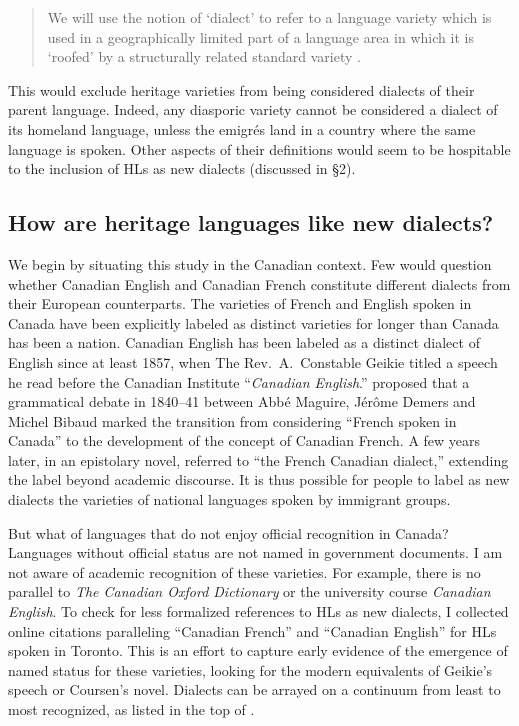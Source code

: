 \documentclass[output=paper]{LSP/langsci}
\begin{document}
\begin{quote}
We will use the notion of ‘dialect’ to refer to a language variety which is used in a geographically limited part of a language area in which it is ‘roofed’ by a structurally related standard variety \citep[1]{auer_study_2004}.
\end{quote}

This would exclude heritage varieties from being considered dialects of their parent language. Indeed, any diasporic variety cannot be considered a dialect of its homeland language, unless the emigrés land in a country where the same language is spoken. Other aspects of their definitions would seem to be hospitable to the inclusion of HLs as new dialects (discussed in §2). 

\subsection{How are heritage languages like new dialects?}
We begin by situating this study in the Canadian context. Few would question whether Canadian English and Canadian French constitute different dialects from their European counterparts. The varieties of French and English spoken in Canada have been explicitly labeled as distinct varieties for longer than Canada has been a nation. Canadian English has been labeled as a distinct dialect of English since at least 1857, when The Rev.\ A.\ Constable Geikie titled a speech he read before the Canadian Institute “\textit{Canadian English}.” \citet{bouchard_langue_1998} proposed that a grammatical debate in 1840--41 between Abbé Maguire, Jérôme Demers and Michel Bibaud marked the transition from considering “French spoken in Canada” to the development of the concept of Canadian French. A few years later, in an epistolary novel, \citet{coursen_it_1846} referred to “the French Canadian dialect,” extending the label beyond academic discourse. It is thus possible for people to label as new dialects the varieties of national languages spoken by immigrant groups. 

But what of languages that do not enjoy official recognition in Canada? Languages without official status are not named in government documents. I am not aware of academic recognition of these varieties. For example, there is no  parallel to \textit{The Canadian Oxford Dictionary} or the university course \textit{Canadian English}. To check for less formalized references to HLs as new dialects, I collected online citations paralleling “Canadian French” and “Canadian English” for HLs spoken in Toronto. This is an effort to capture early evidence of the emergence of named status for these varieties, looking for the modern equivalents of Geikie’s speech or Coursen’s novel. Dialects can be arrayed on a continuum from least to most recognized, as listed in the top of .
\end{document}
